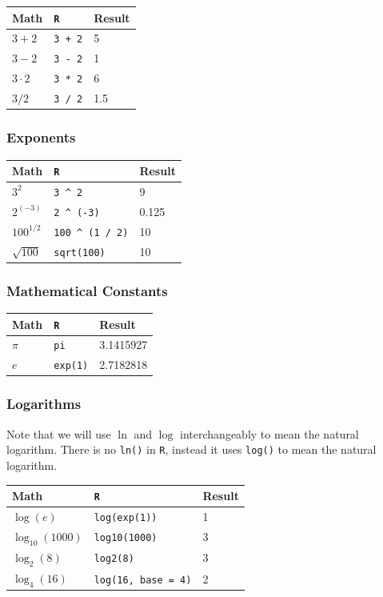 \documentclass[]{book}
\theoremstyle{definition}
\theoremstyle{definition}
\theoremstyle{definition}
\theoremstyle{remark}
\begin{document}
\begin{longtable}[]{@{}lll@{}}
\toprule
Math & \texttt{R} & Result\tabularnewline
\midrule
\endhead
\(3 + 2\) & \texttt{3\ +\ 2} & 5\tabularnewline
\(3 - 2\) & \texttt{3\ -\ 2} & 1\tabularnewline
\(3 \cdot2\) & \texttt{3\ *\ 2} & 6\tabularnewline
\(3 / 2\) & \texttt{3\ /\ 2} & 1.5\tabularnewline
\bottomrule
\end{longtable}

\subsubsection*{Exponents}\label{exponents}

\begin{longtable}[]{@{}lll@{}}
\toprule
Math & \texttt{R} & Result\tabularnewline
\midrule
\endhead
\(3^2\) & \texttt{3\ \^{}\ 2} & 9\tabularnewline
\(2^{(-3)}\) & \texttt{2\ \^{}\ (-3)} & 0.125\tabularnewline
\(100^{1/2}\) & \texttt{100\ \^{}\ (1\ /\ 2)} & 10\tabularnewline
\(\sqrt{100}\) & \texttt{sqrt(100)} & 10\tabularnewline
\bottomrule
\end{longtable}

\subsubsection*{Mathematical Constants}\label{mathematical-constants}

\begin{longtable}[]{@{}lll@{}}
\toprule
Math & \texttt{R} & Result\tabularnewline
\midrule
\endhead
\(\pi\) & \texttt{pi} & 3.1415927\tabularnewline
\(e\) & \texttt{exp(1)} & 2.7182818\tabularnewline
\bottomrule
\end{longtable}

\subsubsection*{Logarithms}\label{logarithms}

Note that we will use \(\ln\) and \(\log\) interchangeably to mean the
natural logarithm. There is no \texttt{ln()} in \texttt{R}, instead it
uses \texttt{log()} to mean the natural logarithm.

\begin{longtable}[]{@{}lll@{}}
\toprule
Math & \texttt{R} & Result\tabularnewline
\midrule
\endhead
\(\log(e)\) & \texttt{log(exp(1))} & 1\tabularnewline
\(\log_{10}(1000)\) & \texttt{log10(1000)} & 3\tabularnewline
\(\log_{2}(8)\) & \texttt{log2(8)} & 3\tabularnewline
\(\log_{4}(16)\) & \texttt{log(16,\ base\ =\ 4)} & 2\tabularnewline
\bottomrule
\end{longtable}
\end{document}

